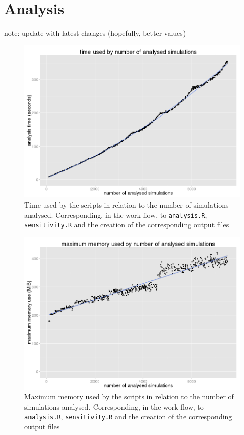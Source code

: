 \documentclass[a4paper,12pt]{report}
\begin{document}
\section{Analysis}
note: update with latest changes (hopefully, better values)
\begin{figure}[!ht]
	\centering
	\includegraphics[scale=0.39]{../data/analysis-timeByNSimulations.png}
	\caption{Time used by the scripts in relation to the number of simulations analysed. Corresponding, in the work-flow, to \texttt{analysis.R}, \texttt{sensitivity.R} and the creation of the corresponding output files}
	\label{app:bench-analysis-time}
\end{figure}

\begin{figure}[!ht]
	\centering
	\includegraphics[scale=0.39]{../data/analysis-maxMemByNSimulations.png}
	\caption{Maximum memory used by the scripts in relation to the number of simulations analysed. Corresponding, in the work-flow, to \texttt{analysis.R}, \texttt{sensitivity.R} and the creation of the corresponding output files}
	\label{app:bench-analysis-mem}
\end{figure}

\end{document}
